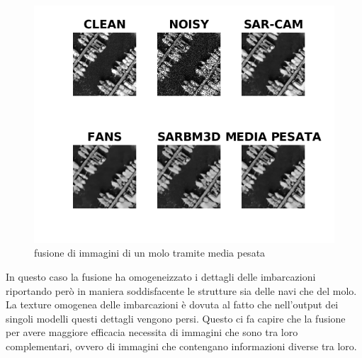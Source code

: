   \begin{figure}[H]
    \centering
    \includegraphics[width=1.1\textwidth]{utils/MPharbor03.png}
    \caption{fusione di immagini di un molo tramite media pesata}
    \label{fig:airplane00MP}
  \end{figure}
  In questo caso la fusione ha omogeneizzato i dettagli delle imbarcazioni riportando però in maniera soddisfacente le strutture sia delle 
  navi che del molo. La texture omogenea delle imbarcazioni è dovuta al fatto che nell'output dei singoli modelli questi dettagli vengono persi. 
  Questo ci fa capire che la fusione per avere maggiore efficacia necessita di immagini che sono tra loro complementari, ovvero di immagini 
  che contengano informazioni diverse tra loro. 
  
